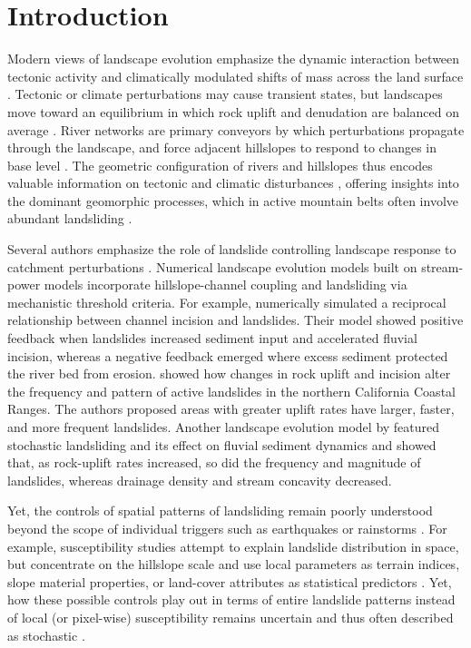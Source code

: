 \documentclass[draft]{agujournal2019}
\begin{document}
\section{Introduction}
\par Modern views of landscape evolution emphasize the dynamic interaction between tectonic activity and climatically modulated shifts of mass across the land surface \cite{Davies2021, Whittaker2012, Irasema2002}. Tectonic or climate perturbations may cause transient states, but landscapes move toward an equilibrium in which rock uplift and denudation are balanced on average \cite{Whittaker2012, Wobus2006, Whipple2004}. River networks are primary conveyors by which perturbations propagate through the landscape, and force adjacent hillslopes to respond to changes in base level \cite{Whipple2004, howard1994}. The geometric configuration of rivers and hillslopes thus encodes valuable information on tectonic and climatic disturbances \cite{whipple2017, stock1999}, offering insights into the dominant geomorphic processes, which in active mountain belts often involve abundant landsliding \cite{Larsen2012, korup2010, Montgomery2002, Campforts2020, Broeckx2020}. 

\par Several authors emphasize the role of landslide controlling landscape response to catchment perturbations \cite{montgomery2001slope}. Numerical landscape evolution models built on stream-power models incorporate hillslope-channel coupling and landsliding via mechanistic threshold criteria. For example,  numerically simulated a reciprocal relationship between channel incision and landslides. Their model showed positive feedback when landslides increased sediment input and accelerated fluvial incision, whereas a negative feedback emerged where excess sediment protected the river bed from erosion.  showed how changes in rock uplift and incision alter the frequency and pattern of active landslides in the northern California Coastal Ranges. The authors proposed areas with greater uplift rates have larger, faster, and more frequent landslides. Another landscape evolution model by  featured stochastic landsliding and its effect on fluvial sediment dynamics and showed that, as rock-uplift rates increased, so did the frequency and magnitude of landslides, whereas drainage density and stream concavity decreased.

\par Yet, the controls of spatial patterns of landsliding remain poorly understood beyond the scope of individual triggers such as earthquakes or rainstorms \cite{yanites2018}. For example, susceptibility studies attempt to explain landslide distribution in space, but concentrate on the hillslope scale and use local parameters as terrain indices, slope material properties, or land-cover attributes as statistical predictors \cite{reichenbach2018, soeters1996, montgomery1994}. Yet, how these possible controls play out in terms of entire landslide patterns instead of local (or pixel-wise) susceptibility remains uncertain and thus often described as stochastic \cite{Benda1997}. 
\end{document}
